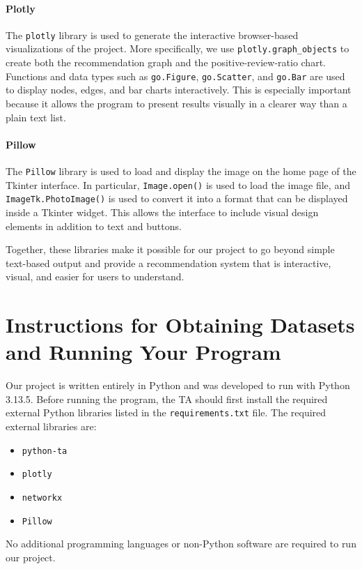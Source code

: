 \documentclass[fontsize=11pt]{article}
\begin{document}
\paragraph{Plotly}
The \texttt{plotly} library is used to generate the interactive browser-based visualizations of the project. More specifically, we use \texttt{plotly.graph\_objects} to create both the recommendation graph and the positive-review-ratio chart. Functions and data types such as \texttt{go.Figure}, \texttt{go.Scatter}, and \texttt{go.Bar} are used to display nodes, edges, and bar charts interactively. This is especially important because it allows the program to present results visually in a clearer way than a plain text list.

\paragraph{Pillow}
The \texttt{Pillow} library is used to load and display the image on the home page of the Tkinter interface. In particular, \texttt{Image.open()} is used to load the image file, and \texttt{ImageTk.PhotoImage()} is used to convert it into a format that can be displayed inside a Tkinter widget. This allows the interface to include visual design elements in addition to text and buttons.

Together, these libraries make it possible for our project to go beyond simple text-based output and provide a recommendation system that is interactive, visual, and easier for users to understand.

\newpage
\section{Instructions for Obtaining Datasets and Running Your Program}

Our project is written entirely in Python and was developed to run with Python 3.13.5. Before running the program, the TA should first install the required external Python libraries listed in the \texttt{requirements.txt} file. The required external libraries are:
\begin{itemize}
    \item \texttt{python-ta}
    \item \texttt{plotly}
    \item \texttt{networkx}
    \item \texttt{Pillow}
\end{itemize}

No additional programming languages or non-Python software are required to run our project.
\end{document}
